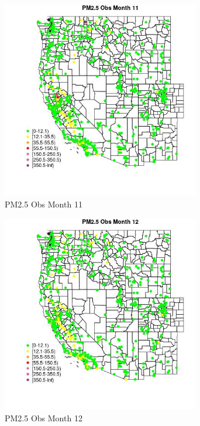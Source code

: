 \begin{figure} 
\centering  
\includegraphics[width=0.77\textwidth]{Code_Outputs/Report_ML_input_PM25_Step4_part_f_de_duplicated_aves_prioritize_24hr_obswNAs_MapObsMo11PM25_Obs.jpg} 
\caption{\label{fig:Report_ML_input_PM25_Step4_part_f_de_duplicated_aves_prioritize_24hr_obswNAsMapObsMo11PM25_Obs}PM2.5 Obs Month 11} 
\end{figure} 
 

\begin{figure} 
\centering  
\includegraphics[width=0.77\textwidth]{Code_Outputs/Report_ML_input_PM25_Step4_part_f_de_duplicated_aves_prioritize_24hr_obswNAs_MapObsMo12PM25_Obs.jpg} 
\caption{\label{fig:Report_ML_input_PM25_Step4_part_f_de_duplicated_aves_prioritize_24hr_obswNAsMapObsMo12PM25_Obs}PM2.5 Obs Month 12} 
\end{figure} 
 

